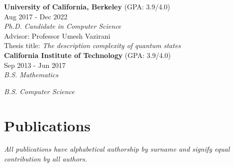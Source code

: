 \documentclass{article}
\begin{document}
\textbf{University of California, Berkeley} ({\small \textsc{GPA}: 3.9/4.0}) \\
Aug 2017 - Dec 2022\\

\textit{Ph.D. Candidate in Computer Science} \\
Advisor: Professor Umesh Vazirani \\ 
Thesis title: \textit{The description complexity of quantum states} \\

\textbf{California Institute of Technology} ({\small \textsc{GPA}: 3.9/4.0}) \\
Sep 2013 - Jun 2017 \\

\textit{B.S. Mathematics}

\textit{B.S. Computer Science}








\section{Publications}
\textit{All publications have alphabetical authorship by surname and signify equal contribution by all authors.}
\end{document}
